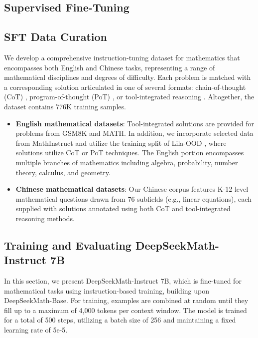 \begin{itemize}[topsep=0pt]
\section{Supervised Fine-Tuning}

\subsection{SFT Data Curation}

We develop a comprehensive instruction-tuning dataset for mathematics that encompasses both English and Chinese tasks, representing a range of mathematical disciplines and degrees of difficulty. Each problem is matched with a corresponding solution articulated in one of several formats: chain-of-thought (CoT) \citep{cot}, program-of-thought (PoT) \citep{pot,pal}, or tool-integrated reasoning \citep{tora}. Altogether, the dataset contains 776K training samples.

\begin{itemize}[topsep=0pt]
    \item \textbf{English mathematical datasets}: Tool-integrated solutions are provided for problems from GSM8K and MATH. In addition, we incorporate selected data from MathInstruct \citep{MathInstruct} and utilize the training split of Lila-OOD \citep{lila}, where solutions utilize CoT or PoT techniques. The English portion encompasses multiple branches of mathematics including algebra, probability, number theory, calculus, and geometry.
    \item \textbf{Chinese mathematical datasets}: Our Chinese corpus features K-12 level mathematical questions drawn from 76 subfields (e.g., linear equations), each supplied with solutions annotated using both CoT and tool-integrated reasoning methods.
\end{itemize}

\subsection{Training and Evaluating DeepSeekMath-Instruct 7B}

In this section, we present DeepSeekMath-Instruct 7B, which is fine-tuned for mathematical tasks using instruction-based training, building upon DeepSeekMath-Base. For training, examples are combined at random until they fill up to a maximum of 4,000 tokens per context window. The model is trained for a total of 500 steps, utilizing a batch size of 256 and maintaining a fixed learning rate of 5e-5.


\end{itemize}
